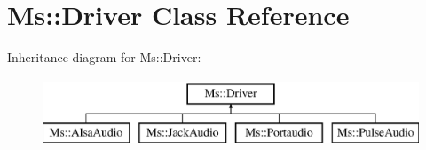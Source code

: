 \hypertarget{class_ms_1_1_driver}{}\section{Ms\+:\+:Driver Class Reference}
\label{class_ms_1_1_driver}
Inheritance diagram for Ms\+:\+:Driver\+:\begin{figure}[H]
\begin{center}
\leavevmode
\includegraphics[height=2.000000cm]{class_ms_1_1_driver}
\end{center}
\end{figure}
